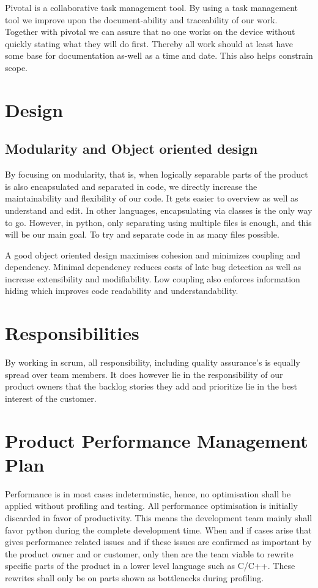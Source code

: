 \documentclass{article}
\begin{document}
Pivotal is a collaborative task management tool.
By using a task management tool we improve upon the document-ability and traceability of our work.
Together with pivotal we can assure that no one works on the device without quickly stating what they will do first.
Thereby all work should at least have some base for documentation as-well as a time and date.
This also helps constrain scope.

\section{Design}

\subsection{Modularity and Object oriented design}
By focusing on modularity, that is, when logically separable parts of the product is also encapsulated and separated in code, we directly increase the maintainability and flexibility of our code.
It gets easier to overview as well as understand and edit.
In other languages, encapsulating via classes is the only way to go.
However, in python, only separating using multiple files is enough, and this will be our main goal.
To try and separate code in as many files possible.

A good object oriented design maximises cohesion and minimizes coupling and dependency.
Minimal dependency reduces costs of late bug detection as well as increase extensibility and modifiability.
Low coupling also enforces information hiding which improves code readability and understandability.

\section{Responsibilities}
By working in scrum, all responsibility, including quality assurance's is equally spread over team members.
It does however lie in the responsibility of our product owners that the backlog stories they add and prioritize lie in the best interest of the customer.

\section{Product Performance Management Plan}
Performance is in most cases indeterminstic, hence, no optimisation shall be applied without profiling and testing. 
All performance optimisation is initially discarded in favor of productivity.
This means the development team mainly shall favor python during the complete development time.
When and if cases arise that gives performance related issues and if these issues are confirmed as important by the product owner and or customer, only then are the team viable to rewrite specific parts of the product in a lower level language such as C/C++.
These rewrites shall only be on parts shown as bottlenecks during profiling.
\end{document}
